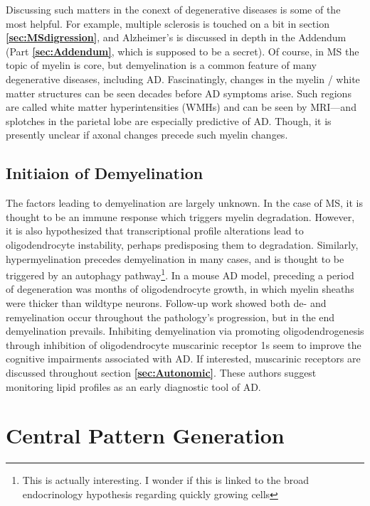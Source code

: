 \documentclass[12pt]{report}
\begin{document}
Discussing such matters in the conext of degenerative diseases is some of the most helpful. For example, multiple sclerosis is touched on a bit in section \textbf{\ref{sec:MSdigression}}, and Alzheimer's is discussed in depth in the Addendum (Part \textbf{\ref{sec:Addendum}}, which is supposed to be a secret). Of course, in MS the topic of myelin is core, but demyelination is a common feature of many degenerative diseases, including AD. Fascinatingly, changes in the myelin / white matter structures can be seen decades before AD symptoms arise. Such regions are called white matter hyperintensities (WMHs) and can be seen by MRI---and splotches in the parietal lobe are especially predictive of AD. Though, it is presently unclear if axonal changes precede such myelin changes.

\subsection{Initiaion of Demyelination}

The factors leading to demyelination are largely unknown. In the case of MS, it is thought to be an immune response which triggers myelin degradation. However, it is also hypothesized that transcriptional profile alterations lead to oligodendrocyte instability, perhaps predisposing them to degradation. Similarly, hypermyelination precedes demyelination in many cases, and is thought to be triggered by an autophagy pathway\footnote{This is actually interesting. I wonder if this is linked to the broad endocrinology hypothesis regarding quickly growing cells}. In a mouse AD model, preceding a period of degeneration was months of oligodendrocyte growth, in which myelin sheaths were thicker than wildtype neurons. Follow-up work showed both de- and remyelination occur throughout the pathology's progression, but in the end demyelination prevails. Inhibiting demyelination via promoting oligodendrogenesis through inhibition of oligodendrocyte muscarinic receptor 1s seem to improve the cognitive impairments associated with AD. If interested, muscarinic receptors are discussed throughout section \textbf{\ref{sec:Autonomic}}. These authors suggest monitoring lipid profiles as an early diagnostic tool of AD.   



\section{Central Pattern Generation}
\end{document}
